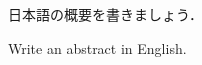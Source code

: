 \begin{j-abstract}
日本語の概要を書きましょう．
\end{j-abstract}

\begin{e-abstract}
Write an abstract in English.
\end{e-abstract}

